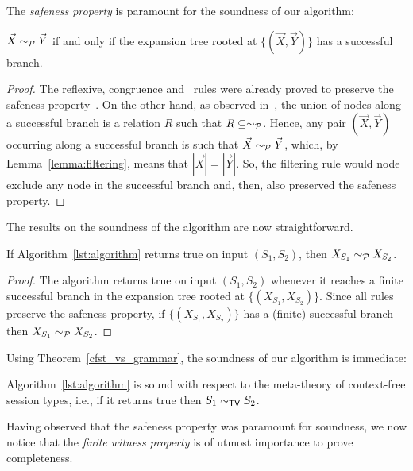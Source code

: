 The \emph{safeness property} is paramount for the soundness of our algorithm:

\begin{proposition} 
\label{prop:safeness}
	$\vec X \sim_{\mathcal{P}} \vec Y$ if and only if the expansion tree rooted 
	at $\{(\vec X, \vec Y)\}$ has a successful branch.
\end{proposition}

\begin{proof}
	The reflexive, congruence and \BPA\ rules were already proved to 
	preserve the safeness property~\cite{janvcar1999techniques}.
	On the other hand, as observed in~\cite{janvcar1999techniques},
	the union of nodes along a successful branch is a relation $R$ 
	such that $R\subseteq \sim_{\mathcal{P}}$. Hence, any pair $(\vec X, \vec Y)$ 
	occurring along a successful branch is such that $\vec X \sim_{\mathcal{P}} \vec Y$,
	which, by Lemma~\ref{lemma:filtering}, means that $|\vec X|=|\vec Y|$.
	So, the filtering rule would node exclude any node in the successful branch
	and, then, also preserved the safeness property.
\end{proof}

The results on the soundness of the algorithm are now straightforward. 

\begin{theorem}
	If Algorithm~\ref{lst:algorithm} returns \textsf{true} on input 
	$(S_1,S_2)$, then $X_{S_1} \sim_{\mathcal{P}} X_{S_2}$.
\end{theorem}

\begin{proof}
	The algorithm returns \textsf{true} on input $(S_1,S_2)$ whenever 
	it reaches a finite successful branch in the expansion tree rooted 
	at $\{(X_{S_1}, X_{S_2})\}$. Since all rules preserve the safeness 
	property, if $\{(X_{S_1}, X_{S_2})\}$ has a (finite) successful 
	branch then $X_{S_1} \sim_{\mathcal{P}} X_{S_2}$.
\end{proof}

Using Theorem~\ref{cfst_vs_grammar}, the soundness of our algorithm is 
immediate:

\begin{theorem}
	Algorithm~\ref{lst:algorithm} is sound with respect to the meta-theory 
	of context-free session types, i.e., if it returns \textsf{true} then $S_1 \sim_{\mathsf{TV}} S_2$.
\end{theorem}

Having observed that the safeness property was paramount for soundness, 
we now notice that the \emph{finite witness property} is of utmost 
importance to prove completeness.

